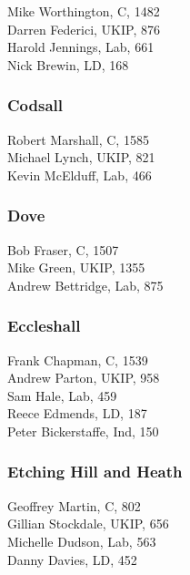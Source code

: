 \documentclass[a4paper,openany,10pt]{book}
\begin{document}
Mike Worthington, C, 1482\\
Darren Federici, UKIP, 876\\
Harold Jennings, Lab, 661\\
Nick Brewin, LD, 168\\


\subsubsection*{Codsall}



Robert Marshall, C, 1585\\
Michael Lynch, UKIP, 821\\
Kevin McElduff, Lab, 466\\


\subsubsection*{Dove}



Bob Fraser, C, 1507\\
Mike Green, UKIP, 1355\\
Andrew Bettridge, Lab, 875\\


\subsubsection*{Eccleshall}



Frank Chapman, C, 1539\\
Andrew Parton, UKIP, 958\\
Sam Hale, Lab, 459\\
Reece Edmends, LD, 187\\
Peter Bickerstaffe, Ind, 150\\


\subsubsection*{Etching Hill and Heath}



Geoffrey Martin, C, 802\\
Gillian Stockdale, UKIP, 656\\
Michelle Dudson, Lab, 563\\
Danny Davies, LD, 452\\
\end{document}
